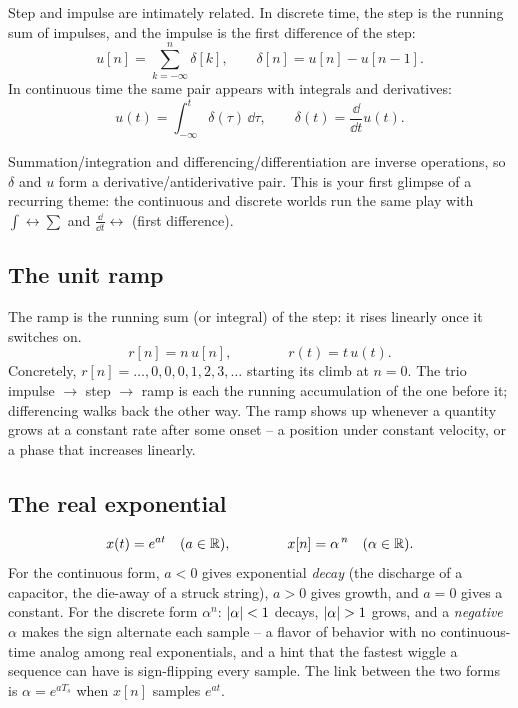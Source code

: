 Step and impulse are intimately related. In discrete time, the step is the running
sum of impulses, and the impulse is the first difference of the step:
\[
  u[n] = \sum_{k=-\infty}^{n} \delta[k], \qquad
  \delta[n] = u[n] - u[n-1].
\]
In continuous time the same pair appears with integrals and derivatives:
\[
  u(t) = \int_{-\infty}^{t}\delta(\tau)\,\dd\tau, \qquad
  \delta(t) = \frac{\dd}{\dd t}u(t).
\]

\begin{intuitionbox}
Summation/integration and differencing/differentiation are inverse operations, so
$\delta$ and $u$ form a derivative/antiderivative pair. This is your first glimpse
of a recurring theme: the continuous and discrete worlds run the same play with
$\int \leftrightarrow \sum$ and $\frac{\dd}{\dd t} \leftrightarrow$ (first
difference).
\end{intuitionbox}

\subsection{The unit ramp}

The ramp is the running sum (or integral) of the step: it rises linearly once it
switches on.
\[
  r[n] = n\,u[n], \qquad\qquad r(t) = t\,u(t).
\]
Concretely, $r[n] = \dots,0,0,0,1,2,3,\dots$ starting its climb at $n=0$. The trio
impulse $\to$ step $\to$ ramp is each the running accumulation of the one before
it; differencing walks back the other way. The ramp shows up whenever a quantity
grows at a constant rate after some onset -- a position under constant velocity, or
a phase that increases linearly.

\subsection{The real exponential}
\label{ch02:exp}

\[
  x(t) = e^{a t} \quad (a \in \mathbb{R}), \qquad\qquad x[n] = \alpha^{\,n} \quad (\alpha \in \mathbb{R}).
\]
For the continuous form, $a < 0$ gives exponential \emph{decay} (the discharge of
a capacitor, the die-away of a struck string), $a > 0$ gives growth, and $a = 0$
gives a constant. For the discrete form $\alpha^n$: $\lvert\alpha\rvert < 1$ decays,
$\lvert\alpha\rvert > 1$ grows, and a \emph{negative} $\alpha$ makes the sign alternate
each sample -- a flavor of behavior with no continuous-time analog among real
exponentials, and a hint that the fastest wiggle a sequence can have is sign-flipping
every sample. The link between the two forms is $\alpha = e^{aT_s}$ when $x[n]$
samples $e^{at}$.

